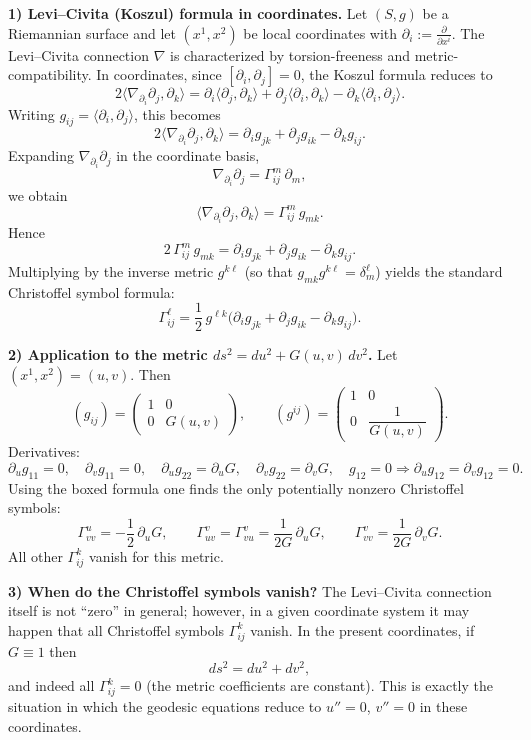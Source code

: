 \documentclass[12pt,a4paper]{article}
\theoremstyle{plain}
\theoremstyle{definition}      %
\begin{document}
	\textbf{1) Levi--Civita (Koszul) formula in coordinates.}
	Let $(S,g)$ be a Riemannian surface and let $(x^1,x^2)$ be local coordinates with
	$\partial_i:=\frac{\partial}{\partial x^i}$.
	The Levi--Civita connection $\nabla$ is characterized by torsion-freeness and metric-compatibility.
	In coordinates, since $[\partial_i,\partial_j]=0$, the Koszul formula reduces to
	\[
	2\big\langle \nabla_{\partial_i}\partial_j,\partial_k\big\rangle
	=
	\partial_i\langle \partial_j,\partial_k\rangle
	+\partial_j\langle \partial_i,\partial_k\rangle
	-\partial_k\langle \partial_i,\partial_j\rangle.
	\]
	Writing $g_{ij}=\langle \partial_i,\partial_j\rangle$, this becomes
	\[
	2\big\langle \nabla_{\partial_i}\partial_j,\partial_k\big\rangle
	=
	\partial_i g_{jk}+\partial_j g_{ik}-\partial_k g_{ij}.
	\]
	Expanding $\nabla_{\partial_i}\partial_j$ in the coordinate basis,
	\[
	\nabla_{\partial_i}\partial_j = \Gamma^{m}_{ij}\,\partial_m,
	\]
	we obtain
	\[
	\big\langle \nabla_{\partial_i}\partial_j,\partial_k\big\rangle
	=
	\Gamma^{m}_{ij}\,g_{mk}.
	\]
	Hence
	\[
	2\,\Gamma^{m}_{ij}\,g_{mk}
	=
	\partial_i g_{jk}+\partial_j g_{ik}-\partial_k g_{ij}.
	\]
	Multiplying by the inverse metric $g^{k\ell}$ (so that $g_{mk}g^{k\ell}=\delta_m^{\ell}$) yields the standard
	Christoffel symbol formula:
	\[
	\boxed{\;
		\Gamma^{\ell}_{ij}
		=
		\frac12\,g^{\ell k}
		\big(\partial_i g_{jk}+\partial_j g_{ik}-\partial_k g_{ij}\big).
		\;}
	\]
	
	\medskip
	\textbf{2) Application to the metric $ds^2=du^2+G(u,v)\,dv^2$.}
	Let $(x^1,x^2)=(u,v)$. Then
	\[
	(g_{ij})=
	\begin{pmatrix}
		1 & 0\\
		0 & G(u,v)
	\end{pmatrix},
	\qquad
	(g^{ij})=
	\begin{pmatrix}
		1 & 0\\
		0 & \dfrac{1}{G(u,v)}
	\end{pmatrix}.
	\]
	Derivatives:
	\[
	\partial_u g_{11}=0,\quad \partial_v g_{11}=0,\quad
	\partial_u g_{22}=\partial_u G,\quad \partial_v g_{22}=\partial_v G,\quad
	g_{12}=0 \Rightarrow \partial_u g_{12}=\partial_v g_{12}=0.
	\]
	Using the boxed formula one finds the only potentially nonzero Christoffel symbols:
	\[
	\boxed{\;
		\Gamma^{u}_{vv} = -\frac12\,\partial_u G,\qquad
		\Gamma^{v}_{uv}=\Gamma^{v}_{vu} = \frac{1}{2G}\,\partial_u G,\qquad
		\Gamma^{v}_{vv} = \frac{1}{2G}\,\partial_v G.
		\;}
	\]
	All other $\Gamma^k_{ij}$ vanish for this metric.
	
	\medskip
	\textbf{3) When do the Christoffel symbols vanish?}
	The Levi--Civita connection itself is not ``zero'' in general; however, in a given coordinate system it may happen
	that all Christoffel symbols $\Gamma^k_{ij}$ vanish. In the present coordinates, if $G\equiv 1$ then
	\[
	ds^2=du^2+dv^2,
	\]
	and indeed all $\Gamma^k_{ij}=0$ (the metric coefficients are constant). This is exactly the situation in which
	the geodesic equations reduce to $u''=0$, $v''=0$ in these coordinates.
	
\end{document}
